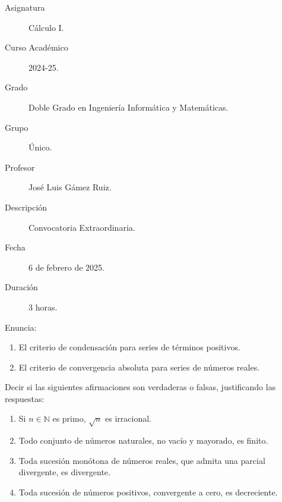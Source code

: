 \documentclass[12pt]{article}
\begin{document}
	
	
	\newcommand{\N}{{\mathbb{N}}} %
	\newcommand{\Q}{{\mathbb{Q}}} %
	\newcommand{\R}{{\mathbb{R}}} %
	
	
	
	\begin{description}
        \item[Asignatura] Cálculo I.
		\item[Curso Académico] 2024-25.
		\item[Grado] Doble Grado en Ingeniería Informática y Matemáticas.
		\item[Grupo] Único.
		\item[Profesor] José Luis Gámez Ruiz.
		\item[Descripción] Convocatoria Extraordinaria.
		\item[Fecha] 6 de febrero de 2025.
		\item[Duración] 3 horas.
		
	\end{description}
	\newpage
	
	
	\begin{ejercicio}[1 punto] Enuncia:
		\begin{enumerate}
			\item El criterio de condensación para series de términos positivos.
			\item El criterio de convergencia absoluta para series de números reales.
		\end{enumerate}
	\end{ejercicio}
	
	\begin{ejercicio}[2 puntos] Decir si las siguientes afirmaciones son verdaderas o falsas, justificando las respuestas:
		\begin{enumerate}
			\item Si $n \in \N$ es primo, $\sqrt{n}$ es irracional.
			\item Todo conjunto de números naturales, no vacío y mayorado, es finito.
			\item Toda sucesión monótona de números reales, que admita una parcial divergente, es divergente.
			\item Toda sucesión de números positivos, convergente a cero, es decreciente.
		\end{enumerate}
	\end{ejercicio}
	
\end{document}
